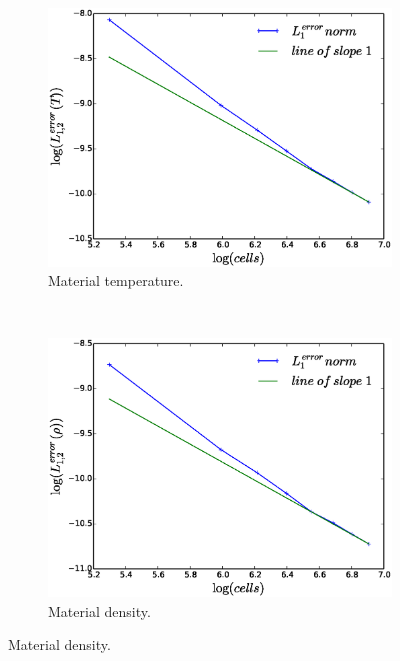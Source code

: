 \documentclass[times,doublespace]{fldauth}%
\begin{document}
%
\begin{figure}[ht]
    \begin{subfigure}{0.5\textwidth}
    \centering
    \includegraphics[width=\linewidth]{figures/dpt-xs/mach-3-mat-temp-convergence.eps}
    \caption{Material temperature.}\label{fig:mach-3-dpt-xs-temp-conv}
    \end{subfigure}
    ~
    \begin{subfigure}{0.5\textwidth}
    \centering
    \includegraphics[width=\linewidth]{figures/dpt-xs/mach-3-density-convergence.eps}
    \caption{Material density.}\label{fig:mach-3-dpt-xs-density-conv}
    \end{subfigure}
    

\end{figure}
\end{document}
